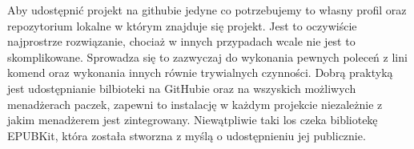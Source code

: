 Aby udostępnić projekt na githubie jedyne co potrzebujemy to własny profil oraz repozytorium lokalne w którym znajduje się projekt. Jest to oczywiście najprostrze rozwiązanie, chociaż w innych przypadach wcale nie jest to skomplikowane. Sprowadza się to zazwyczaj do wykonania pewnych poleceń z lini komend oraz wykonania innych równie trywialnych czynności. Dobrą praktyką jest udostępnianie bilbioteki na GitHubie oraz na wszyskich możliwych menadżerach paczek, zapewni to instalację w każdym projekcie niezależnie z jakim menadżerem jest zintegrowany. Niewątpliwie taki los czeka bibliotekę EPUBKit, która została stworzna z myślą o udostępnieniu jej publicznie.
